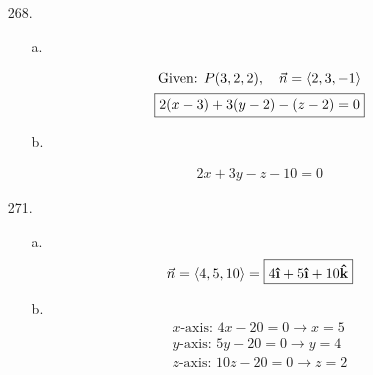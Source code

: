 ﻿\documentclass[10pt, letterpaper]{article}
\begin{document}
    \begin{enumerate}
        \item [268.]\mbox{}
        \begin{mdframed}
            \begin{itemize}
                \item [a.]
                
                    \begin{equation*}
                        \begin{gathered}
                            \text{Given: } P(3,2,2), \quad \vec{n} = \expval{2,3,-1} \\
                            \boxed{2(x-3) + 3(y-2) - (z-2) = 0} \\
                        \end{gathered}
                    \end{equation*}

                \item [b.]
                
                    \begin{equation*}
                        \begin{gathered}
                            \boxed{2x + 3y - z - 10 = 0}
                        \end{gathered}
                    \end{equation*}
            \end{itemize}
        \end{mdframed}

        \item [271.]\mbox{}
        \begin{mdframed}
            \begin{itemize}
                \item [a.]
                \begin{equation*}
                    \begin{gathered}
                        \vec{n} = \expval{4,5,10} = \boxed{4\ihat + 5\ihat + 10\khat}
                    \end{gathered}
                \end{equation*}
                \item [b.]
                \begin{equation*}
                    \begin{gathered}
                        \text{$x$-axis: } 4x - 20 = 0 \rightarrow \boxed{x = 5} \\
                        \text{$y$-axis: } 5y - 20 = 0 \rightarrow \boxed{y = 4} \\
                        \text{$z$-axis: } 10z - 20 = 0 \rightarrow \boxed{z = 2}
                    \end{gathered}
                \end{equation*}      
            \end{itemize}
        \end{mdframed}


\end{enumerate}
\end{document}
